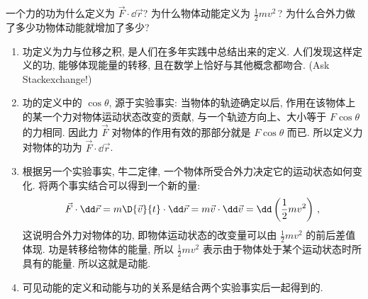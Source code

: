 \documentclass{article}
\begin{document}
\begin{question}
  一个力的功为什么定义为 $\vec{F}\cdot\dd\vec{r}$? 为什么物体动能定义为 $\frac{1}{2}mv^2\,$? 为什么合外力做了多少功物体动能就增加了多少?
\end{question}
\begin{answer}
  \begin{enumerate}
    \item 功定义为力与位移之积, 是人们在多年实践中总结出来的定义. 人们发现这样定义的功, 能够体现能量的转移, 且在数学上恰好与其他概念都吻合. (Ask Stackexchange!)
    \item 功的定义中的 $\cos\theta$, 源于实验事实: 当物体的轨迹确定以后, 作用在该物体上的某一个力对物体运动状态改变的贡献, 与一个轨迹方向上、大小等于 $F\cos\theta$ 的力相同. 因此力 $\vec{F}$ 对物体的作用有效的那部分就是 $F\cos\theta$ 而已. 所以定义力对物体的功为 $\vec{F}\cdot\dd\vec{r}$.
    \item 根据另一个实验事实, 牛二定律, 一个物体所受合外力决定它的运动状态如何变化. 将两个事实结合可以得到一个新的量:
      \begin{equation*}
	\vec{F}\cdot\dd\vec{r}=m\D{\vec{v}}{t}\cdot\dd\vec{r}=m\vec{v}\cdot\dd\vec{v}=\dd\left( \frac{1}{2}mv^2 \right)\,,
      \end{equation*}
      这说明合外力对物体的功, 即物体运动状态的改变量可以由 $\frac{1}{2}mv^2$ 的前后差值体现. 功是转移给物体的能量, 所以 $\frac{1}{2}mv^2$ 表示由于物体处于某个运动状态时所具有的能量. 所以这就是动能.
    \item 可见动能的定义和动能与功的关系是结合两个实验事实后一起得到的.
  \end{enumerate}
\end{answer}
\end{document}
